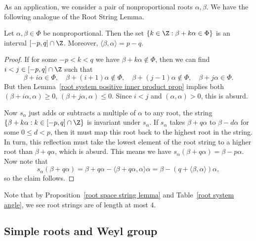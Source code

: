 As an application, we consider a pair of nonproportional roots $\alpha,\beta$. We have the following analogue of the Root String Lemma.
\begin{proposition}\label{root space string lemma}
Let $\alpha,\beta\in\Phi$ be nonproportional. Then the set $\{k\in\Z:\beta+k\alpha\in\Phi\}$ is an interval $[-p,q]\cap\Z$. Moreover, $\langle\beta,\alpha\rangle=p-q$.
\end{proposition}
\begin{proof}
If for some $-p<k<q$ we have $\beta+k\alpha\notin\Phi$, then we can find $i<j\in[-p,q]\cap\Z$ such that
\[\beta+i\alpha\in\Phi,\quad\beta+(i+1)\alpha\notin\Phi,\quad \beta+(j-1)\alpha\notin\Phi,\quad \beta+j\alpha\in\Phi.\]
But then Lemma~\ref{root system positive inner product prop} implies both $(\beta+i\alpha,\alpha)\geq 0$, $(\beta+j\alpha,\alpha)\leq 0$. Since $i<j$ and $(\alpha,\alpha)>0$, this is absurd.\par
Now $s_\alpha$ just adds or subtracts a multiple of $\alpha$ to any root, the string $\{\beta+k\alpha:k\in[-p,q]\cap\Z\}$ is invariant under $s_\alpha$. If $s_\alpha$ takes $\beta+q\alpha$ to $\beta-d\alpha$ for some $0\leq d<p$, then it must map this root back to the highest root in the string. In turn, this reflection must take the lowest element of the root string to a higher root than $\beta+q\alpha$, which is absurd. This means we have $s_\alpha(\beta+q\alpha)=\beta-p\alpha$. Now note that
\[s_\alpha(\beta+q\alpha)=\beta+q\alpha-\langle\beta+q\alpha,\alpha\rangle\alpha=\beta-(q+\langle\beta,\alpha\rangle)\alpha,\]
so the claim follows.
\end{proof}
Note that by Proposition~\ref{root space string lemma} and Table~\ref{root system angle}, we see root strings are of length at most $4$.
\subsection{Simple roots and Weyl group}
